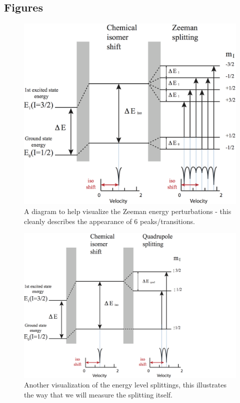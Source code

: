 \documentclass[reprint, nobibnotes, amssymb, amsmath, amsfonts, mathtools, mathrsfs, floatfix]{revtex4-1}
\begin{document}
    \subsection{Figures}
    \begin{widetext}

      \begin{figure}[h]
        \centering
        \includegraphics[width=\linewidth]{Mossb_energy_shifts_zeeman.png}
        \caption{A diagram to help visualize the Zeeman energy perturbations - this cleanly describes the appearance of 6 peaks/transitions.~\cite{lab_manual}~\label{zeeman_shifts}}
      \end{figure}

      \begin{figure}[h]
        \centering
        \includegraphics[width=\linewidth]{Mossb_quad_shifts.png}
        \caption{Another visualization of the energy level splittings, this illustrates the way that we will measure the splitting itself.~\cite{lab_manual}~\label{quadrupole_shifts}}
      \end{figure}


\end{widetext}
\end{document}
